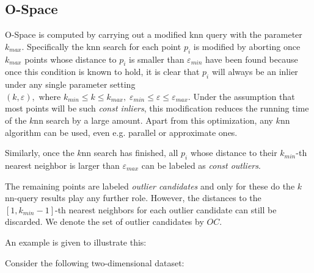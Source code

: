 \documentclass[runningheads]{llncs}
\begin{document}
\subsection{O-Space}
O-Space is computed by carrying out a modified knn query with the parameter $k_{max}$. Specifically  the knn search for each point $p_i$ is modified by aborting once $k_{max}$ points whose distance to $p_i$ is smaller than $\varepsilon_{min}$ have been found because once this condition is known to hold, it is clear that $p_i$ will always be an inlier under any single parameter setting $(k,\varepsilon), \text{ where } k_{min}\leq k \leq k_{max},\; \varepsilon_{min}\leq \varepsilon \leq \varepsilon_{max}$. Under the assumption that most points will be such \emph{const inliers}, this modification reduces the running time of the $k$nn search by a large amount. Apart from this optimization, any $k$nn algorithm can be used, even e.g. parallel or approximate ones.

Similarly, once the $k$nn search has finished, all $p_i$ whose distance to their $k_{min}$-th nearest neighbor is larger than $\varepsilon_{max}$ can be labeled as \emph{const outliers}.

The remaining points are labeled \emph{outlier candidates} and only for these do the $k$nn-query results play any further role.  However, the distances to the $[1,k_{min}-1]$-th nearest neighbors for each outlier candidate can still be discarded. We denote the set of outlier candidates by $OC$.

\newpage
An example is given to illustrate this:

Consider the following two-dimensional dataset:
\end{document}
